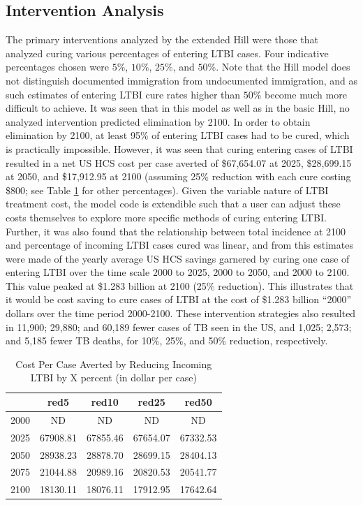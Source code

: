 \documentclass{amsart}
\begin{document}
\subsection{Intervention Analysis}
The primary interventions analyzed by the extended Hill were those that analyzed
curing various percentages of entering LTBI cases. Four indicative percentages
chosen were $5\%$, $10\%$, $25\%$, and $50\%$. Note that the Hill model does
not distinguish documented immigration from undocumented immigration, and as
such estimates of entering LTBI cure rates higher than $50\%$ become much more
difficult to achieve. It was seen that in this model as well as in the basic
Hill, no analyzed intervention predicted elimination by 2100. In order to obtain
elimination by 2100, at least 95\% of entering LTBI cases had to be cured, which
is practically impossible. However, it was seen that curing entering cases of
LTBI resulted in a net US HCS cost per case averted of \$67,654.07 at 2025, \$28,699.15 at 2050,
and \$17,912.95 at 2100 (assuming 25\% reduction with each cure costing \$800; see Table
\ref{tab:cpcaArt} for other percentages). Given the variable nature of LTBI
treatment cost, the model code is extendible such that a user can adjust these
costs themselves to explore more specific methods of curing entering LTBI.
Further, it was also found that the relationship between total incidence at 2100
and percentage of incoming LTBI cases cured was linear, and from this estimates
were made of the yearly average US HCS savings garnered by curing one case of
entering LTBI over the time scale 2000 to 2025, 2000 to 2050, and 2000 to 2100.
This value peaked at \$1.283 billion at 2100 (25\% reduction). This illustrates
that it would be cost saving to cure cases of LTBI at the cost of \$1.283
billion ``2000'' dollars over the time period 2000-2100. These intervention
strategies also resulted in 11,900; 29,880; and 60,189 fewer cases of TB seen in
the US, and 1,025; 2,573; and 5,185 fewer TB deaths, for 10\%, 25\%, and 50\%
reduction, respectively.

\begin{table}
\centering
\begin{tabular}{|r|cccc|}
  \hline
 & red5 & red10 & red25 & red50 \\ 
  \hline
2000 & ND & ND & ND & ND \\ 
  2025 & 67908.81 & 67855.46 & 67654.07 & 67332.53 \\ 
  2050 & 28938.23 & 28878.70 & 28699.15 & 28404.13 \\ 
  2075 & 21044.88 & 20989.16 & 20820.53 & 20541.77 \\ 
  2100 & 18130.11 & 18076.11 & 17912.95 & 17642.64 \\ 
   \hline
\end{tabular}
\caption{Cost Per Case Averted by Reducing Incoming LTBI by X percent (in dollar per case)} 
\label{tab:cpcaArt}
\end{table}
\end{document}
